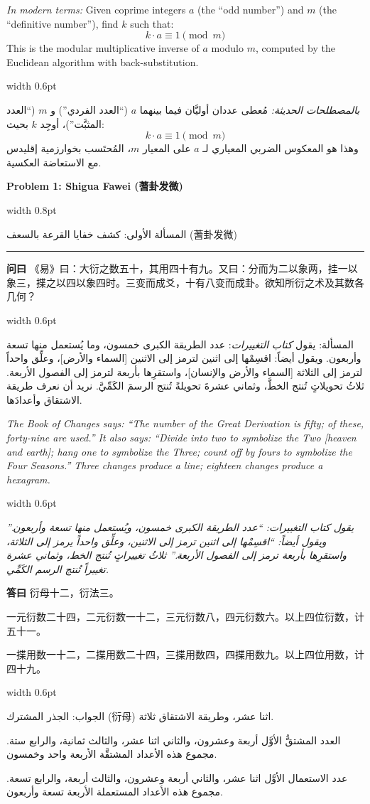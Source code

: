 \documentclass[11pt,a4paper]{article}
\newlength{\cnwidth}
\newlength{\arwidth}
\newcommand{\paralleltext}[2]{%
  \par\medskip\noindent
  \begin{minipage}[t]{\cnwidth}%
    \small #1%
  \end{minipage}%
  \hfill\textcolor{colrule}{\vrule width 0.6pt}\hfill
  \begin{minipage}[t]{\arwidth}%
    \small\arabicfont\beginR #2\endR%
  \end{minipage}%
  \par\medskip
}
\newcommand{\parallelsection}[2]{%
  \par\bigskip\noindent
  \begin{minipage}[t]{\cnwidth}%
    \Large\bfseries\color{sectioncolor} #1%
  \end{minipage}%
  \hfill\textcolor{colrule}{\vrule width 0.8pt}\hfill
  \begin{minipage}[t]{\arwidth}%
    \Large\arabicfontbf\color{sectioncolor}\beginR #2\endR%
  \end{minipage}%
  \par\medskip\noindent\textcolor{colrule}{\rule{\textwidth}{0.6pt}}\par\medskip
}
\newcommand{\cnlabel}[1]{\textbf{\color{notecolor}#1}}
\newcommand{\arlabel}[1]{\arabicfontbf\color{notecolor}\beginR #1\endR}
\begin{document}
\paralleltext{%
\textit{In modern terms:} Given coprime integers $a$ (the ``odd number'') and $m$ (the ``definitive number''), find $k$ such that:
\[k \cdot a \equiv 1 \pmod{m}\]
This is the modular multiplicative inverse of $a$ modulo $m$, computed by the Euclidean algorithm with back-substitution.%
}{%
\textit{بالمصطلحات الحديثة:} مُعطى عددان أوليَّان فيما بينهما $a$ (``العدد الفردي'') و $m$ (``العدد المثبَّت'')، أوجِد $k$ بحيث:
\[k \cdot a \equiv 1 \pmod{m}\]
وهذا هو المعكوس الضربي المعياري لـ $a$ على المعيار $m$، المُحتَسب بخوارزمية إقليدس مع الاستعاضة العكسية.
}

\newpage

\parallelsection{Problem 1: Shigua Fawei (蓍卦发微)}{المسألة الأولى: كشف خفايا القرعة بالسعف (蓍卦发微)}

\paralleltext{%
\cnlabel{问曰} 《易》曰：大衍之数五十，其用四十有九。又曰：分而为二以象两，挂一以象三，揲之以四以象四时。三变而成爻，十有八变而成卦。欲知所衍之术及其数各几何？%
}{%
\arlabel{المسألة:} يقول \textit{كتاب التغييرات}: عدد الطريقة الكبرى خمسون، وما يُستعمل منها تسعة وأربعون. ويقول أيضاً: اقسِمْها إلى اثنين لترمز إلى الاثنين [السماء والأرض]، وعلِّق واحداً لترمز إلى الثلاثة [السماء والأرض والإنسان]، واستقرِها بأربعة لترمز إلى الفصول الأربعة. ثلاثُ تحويلاتٍ تُنتج الخطَّ، وثماني عشرةَ تحويلةً تُنتج الرسمَ الكَمِّيَّ. نريد أن نعرف طريقة الاشتقاق وأعدادَها.
}

\paralleltext{%
\textit{The Book of Changes says: ``The number of the Great Derivation is fifty; of these, forty-nine are used.'' It also says: ``Divide into two to symbolize the Two [heaven and earth]; hang one to symbolize the Three; count off by fours to symbolize the Four Seasons.'' Three changes produce a line; eighteen changes produce a hexagram.}%
}{%
\textit{يقول كتاب التغييرات: ``عدد الطريقة الكبرى خمسون، ويُستعمل منها تسعة وأربعون.'' ويقول أيضاً: ``اقسِمْها إلى اثنين ترمز إلى الاثنين، وعلِّق واحداً يرمز إلى الثلاثة، واستقرِها بأربعة ترمز إلى الفصول الأربعة.'' ثلاثُ تغييراتٍ تُنتج الخط، وثماني عشرة تغييراً تُنتج الرسم الكَمِّي.}
}

\paralleltext{%
\cnlabel{答曰} 衍母十二，衍法三。

一元衍数二十四，二元衍数一十二，三元衍数八，四元衍数六。以上四位衍数，计五十一。

一揲用数一十二，二揲用数二十四，三揲用数四，四揲用数九。以上四位用数，计四十九。%
}{%
\arlabel{الجواب:} الجذر المشترك (衍母) اثنا عشر، وطريقة الاشتقاق ثلاثة.

العدد المشتقُّ الأوَّل أربعة وعشرون، والثاني اثنا عشر، والثالث ثمانية، والرابع ستة. مجموع هذه الأعداد المشتقَّة الأربعة واحد وخمسون.

عدد الاستعمال الأوَّل اثنا عشر، والثاني أربعة وعشرون، والثالث أربعة، والرابع تسعة. مجموع هذه الأعداد المستعملة الأربعة تسعة وأربعون.
}
\end{document}
